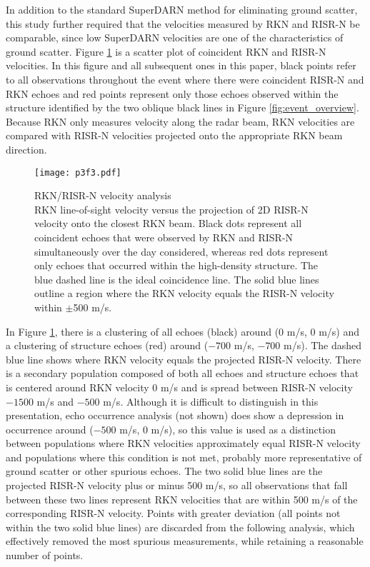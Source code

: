 \label{sec:velocity}
In addition to the standard SuperDARN method for eliminating ground scatter, this study further required that the velocities measured by RKN and RISR-N be comparable, since low SuperDARN velocities are one of the characteristics of ground scatter.  Figure \ref{fig:velocity} is a scatter plot of coincident RKN and RISR-N velocities.  In this figure and all subsequent ones in this paper, black points refer to all observations throughout the event where there were coincident RISR-N and RKN echoes and red points represent only those echoes observed within the structure identified by the two oblique black lines in Figure \ref{fig:event_overview}.  Because RKN only measures velocity along the radar beam, RKN velocities are compared with RISR-N velocities projected onto the appropriate RKN beam direction.

\begin{figure}
	\texttt{[image: p3f3.pdf]}
  \caption[RKN/RISR-N velocity analysis]{{\:}RKN/RISR-N velocity analysis\\ RKN line-of-sight velocity versus the projection of 2D RISR-N velocity onto the closest RKN beam. Black dots represent all coincident echoes that were observed by RKN and RISR-N simultaneously over the day considered, whereas red dots represent only echoes that occurred within the high-density structure.  The blue dashed line is the ideal coincidence line. The solid blue lines outline a region where the RKN velocity equals the RISR-N velocity within \(\pm\)500 m/s.}
  \label{fig:velocity}
\end{figure}

In Figure \ref{fig:velocity}, there is a clustering of all echoes (black) around (0 m/s, 0 m/s) and a clustering of structure echoes (red) around (\(-700\) m/s, \(-700\) m/s).  The dashed blue line shows where RKN velocity equals the projected RISR-N velocity.  There is a secondary population composed of both all echoes and structure echoes that is centered around RKN velocity 0 m/s and is spread between RISR-N velocity \(-1500\) m/s and \(-500\) m/s.  Although it is difficult to distinguish in this presentation, echo occurrence analysis (not shown) does show a depression in occurrence around (\(-500\) m/s, 0 m/s), so this value is used as a distinction between populations where RKN velocities approximately equal RISR-N velocity and populations where this condition is not met, probably more representative of ground scatter or other spurious echoes.  The two solid blue lines are the projected RISR-N velocity plus or minus 500 m/s, so all observations that fall between these two lines represent RKN velocities that are within 500 m/s of the corresponding RISR-N velocity.  Points with greater deviation (all points not within the two solid blue lines) are discarded from the following analysis, which effectively removed the most spurious measurements, while retaining a reasonable number of points.

